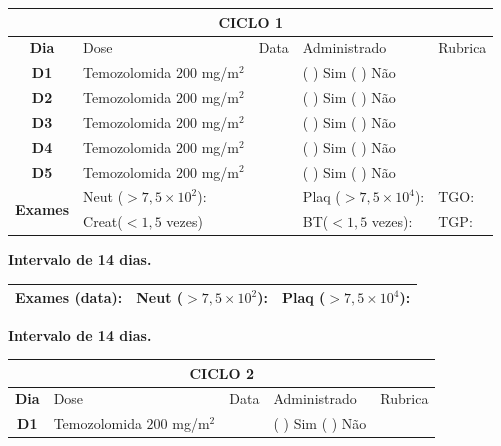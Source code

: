 \documentclass[11pt,a4paper,oldfontcommands]{memoir}
\begin{document}
\begin{center}
\begin{table}[H]
\begin{tabular}{p{1cm}p{5cm}|p{1cm}|p{4.5cm}|p{2cm}}
	\hline
	\multicolumn{5}{c}{\textbf{CICLO 1}}\\
\hline
    \multicolumn{1}{c|}{\multirow{1}{*}{\textbf{Dia}}}&{Dose}&{Data}&{Administrado}&{Rubrica} \\
    \hline
    \multicolumn{1}{c|}{\multirow{1}{*}{\textbf{D1}}}&{Temozolomida \(200\) mg/m\(^2\)}&&{(  ) Sim (  ) Não}&\\
    \multicolumn{1}{c|}{\multirow{1}{*}{\textbf{D2}}}&{Temozolomida \(200\) mg/m\(^2\)}&&{(  ) Sim (  ) Não}&\\
    \multicolumn{1}{c|}{\multirow{1}{*}{\textbf{D3}}}&{Temozolomida \(200\) mg/m\(^2\)}&&{(  ) Sim (  ) Não}&\\
    \multicolumn{1}{c|}{\multirow{1}{*}{\textbf{D4}}}&{Temozolomida \(200\) mg/m\(^2\)}&&{(  ) Sim (  ) Não}&\\
    \multicolumn{1}{c|}{\multirow{1}{*}{\textbf{D5}}}&{Temozolomida \(200\) mg/m\(^2\)}&&{(  ) Sim (  ) Não}&\\
    \hline
    \multicolumn{1}{c|}{\multirow{2}{*}{\textbf{Exames}}}&\multicolumn{2}{l|}{Neut (\(>7,5\times10^2\)):}&{Plaq (\(>7,5\times10^4\)):}&{TGO:}\\
    \cline{2-5}
    \multicolumn{1}{c|}{\multirow{2}{*}{{}}}&\multicolumn{2}{l|}{Creat(\(<1,5\) vezes)}&{BT(\(<1,5\) vezes):}&{TGP:}
    \\
    \hline
\end{tabular}
\end{table}
\textbf{Intervalo de 14 dias.}
\begin{table}[H]
\begin{tabular}{p{5cm}|p{5cm}|p{4.7cm}}
    \hline
    \textbf{Exames (data):}&{Neut (\(>7,5\times10^2\)):}&{Plaq (\(>7,5\times10^4\)):}\\
    \hline
\end{tabular}
\end{table}
\textbf{Intervalo de 14 dias.}
\begin{table}[H]
\begin{tabular}{p{1cm}p{5cm}|p{1cm}|p{4.5cm}|p{2cm}}
	\hline
	\multicolumn{5}{c}{\textbf{CICLO 2}}\\
\hline
    \multicolumn{1}{c|}{\multirow{1}{*}{\textbf{Dia}}}&{Dose}&{Data}&{Administrado}&{Rubrica} \\
    \hline
    \multicolumn{1}{c|}{\multirow{1}{*}{\textbf{D1}}}&{Temozolomida \(200\) mg/m\(^2\)}&&{(  ) Sim (  ) Não}&\\

\end{tabular}
\end{table}
\end{center}
\end{document}

